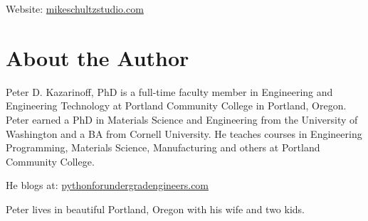 \documentclass{book}
\begin{document}
Website:
\href{http://mikeschultzstudio.squarespace.com/}{mikeschultzstudio.com}
    




    
        \hypertarget{about-the-author}{%
\section{About the Author}\label{about-the-author}}
    




    
        Peter D. Kazarinoff, PhD is a full-time faculty member in Engineering
and Engineering Technology at Portland Community College in Portland,
Oregon. Peter earned a PhD in Materials Science and Engineering from the
University of Washington and a BA from Cornell University. He teaches
courses in Engineering Programming, Materials Science, Manufacturing and
others at Portland Community College.

He blogs at:
\href{https://pythonforundergradengineers.com/}{pythonforundergradengineers.com}

Peter lives in beautiful Portland, Oregon with his wife and two kids.
    




    
    
    
    
\end{document}
